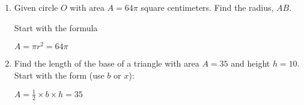 \begin{enumerate}
  \item Given circle $O$ with area $A=64 \pi$ square centimeters. Find the radius, $AB$.
  \begin{multicols}{2}
     \par
   Start with the formula \par \smallskip
  $A = \pi r^2 = 64 \pi$
  \end{multicols} \vspace{1cm}

\item Find the length of the base of a triangle with area $A=35$ and height $h=10$. Start with the form (use $b$ or $x$): \par \medskip
$A = \frac{1}{2} \times b \times h = 35$
  \begin{flushright}
  \end{flushright}


\end{enumerate}
